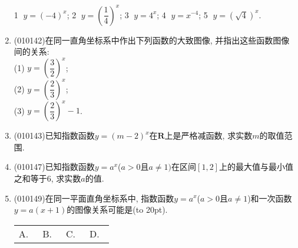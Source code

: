 \documentclass[10pt,a4paper]{article}
\newcommand{\bracket}[1]{(\hbox to #1pt{})}
\newcommand{\fourch}[4]{\par\begin{tabular}{p{.23\textwidth}p{.23\textwidth}p{.23\textwidth}p{.23\textwidth}}
A.~#1 &B.~#2& C.~#3& D.~#4
\end{tabular}}
\begin{document}
\begin{enumerate}[1.]
\textcircled{1} $y=(-4)^x$; \textcircled{2} $y=(\dfrac 14)^x$; \textcircled{3} $y=4^x$; \textcircled{4} $y=x^{-4}$; \textcircled{5} $y=(\sqrt 4)^x$.
\item {\tiny (010142)}在同一直角坐标系中作出下列函数的大致图像, 并指出这些函数图像间的关系:\\
(1) $y=(\dfrac 32)^x$;\\
(2) $y=(\dfrac 23)^x$;\\
(3) $y=(\dfrac 23)^x-1$.
\item {\tiny (010143)}已知指数函数$y=(m-2)^x$在$\mathbf{R}$上是严格减函数, 求实数$m$的取值范围.
\item {\tiny (010147)}已知指数函数$y=a^x$($a>0$且$a\ne 1)$在区间$[1, 2]$上的最大值与最小值之和等于$6$, 求实数$a$的值.
\item {\tiny (010149)}在同一平面直角坐标系中, 指数函数$y=a^x$($a>0$且$a\ne 1$)和一次函数$y=a(x+1)$的图像关系可能是\bracket{20}.
\fourch{\begin{tikzpicture}[>=latex,scale=0.7]
\draw [->] (-2,0) -- (2,0) node [below] {$x$};
\draw [->] (0,-1) -- (0,2.5) node [left] {$y$};
\draw (0,0) node [below left] {$O$};
\draw [domain = -2:1.3] plot (-\x,{pow(2,\x)});
\draw (-1.5,-1) -- (0.25,2.5);
\draw (0.2,1) -- (0,1) node [below left] {$1$};
\draw (-1,0.2) -- (-1,0) node [above left] {$-1$};
\end{tikzpicture}}{\begin{tikzpicture}[>=latex,scale=0.7]
\draw [->] (-2,0) -- (2,0) node [below] {$x$};
\draw [->] (0,-1) -- (0,2.5) node [left] {$y$};
\draw (0,0) node [below left] {$O$};
\draw [domain = -2:1.3] plot (-\x,{pow(2,\x)});
\draw (-1,-1) -- (2,0.5);
\draw (0.2,1) -- (0,1) node [below left] {$1$};
\draw (1,0.2) -- (1,0) node [below] {$1$};
\end{tikzpicture}}{\begin{tikzpicture}[>=latex,scale=0.7]
\draw [->] (-2,0) -- (2,0) node [below] {$x$};
\draw [->] (0,-1) -- (0,2.5) node [left] {$y$};
\draw (0,0) node [below left] {$O$};
\draw [domain = -2:1.3] plot (\x,{pow(2,\x)});
\draw (-1.5,-1) -- (0.25,2.5);
\draw (0.2,1) -- (0,1) node [below right] {$1$};
\draw (-1,0.2) -- (-1,0) node [below left] {$-1$};
\end{tikzpicture}}{\begin{tikzpicture}[>=latex,scale=0.7]
\draw [->] (-2,0) -- (2,0) node [below] {$x$};
\draw [->] (0,-1) -- (0,2.5) node [left] {$y$};
\draw (0,0) node [below left] {$O$};
\draw [domain = -2:1.3] plot (\x,{pow(2,\x)});
\draw (-2,-0.5) -- (2,1.5);
\draw (0.2,1) -- (0,1) node [above left] {$1$};

\end{tikzpicture}}
\end{enumerate}
\end{document}
